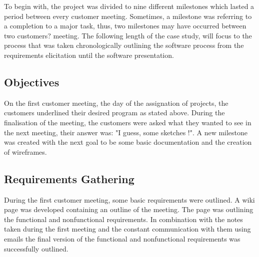 \documentclass{l3proj}
\begin{document}
To begin with, the project was divided to nine different milestones which lasted a period between every customer meeting. Sometimes, a milestone was referring to a completion to a major task, thus, two milestones may have occurred between two customers? meeting. The following length of the case study, will focus to the process that was taken chronologically outlining the software process from the requirements elicitation until the software presentation.

\subsection{Objectives}
\label{objectives}

On the first customer meeting, the day of the assignation of projects, the customers underlined their desired program as stated above. During the finalisation of the meeting, the customers were asked what they wanted to see in the next meeting, their answer was: "I guess, some sketches !". A new milestone was created with the next goal to be some basic documentation and the creation of wireframes.

\subsection{Requirements Gathering}
\label{requirements}

During the first customer meeting, some basic requirements were outlined. A wiki page was developed containing an outline of the meeting. The page was outlining the functional and nonfunctional requirements. In combination with the notes taken during the first meeting and the constant communication with them using emails the final version of the functional and nonfunctional requirements was successfully outlined.
\end{document}
